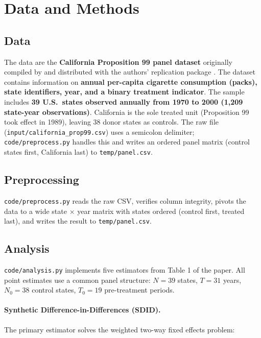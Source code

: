 \documentclass[12pt]{article}
\begin{document}
\section{Data and Methods}

\subsection*{Data}

The data are the \textbf{California Proposition 99 panel dataset} originally
compiled by \citet{abadie2010synthetic} and distributed with the authors'
replication package \citep{arkhangelsky2021synthdid}.
The dataset contains information on \textbf{annual per-capita cigarette
consumption (packs), state identifiers, year, and a binary treatment indicator}.
The sample includes \textbf{39 U.S.\ states observed annually from 1970 to 2000
(1,209 state-year observations)}.
California is the sole treated unit (Proposition 99 took effect in 1989),
leaving 38 donor states as controls.
The raw file (\texttt{input/california\_prop99.csv}) uses a semicolon delimiter;
\texttt{code/preprocess.py} handles this and writes an ordered panel matrix
(control states first, California last) to \texttt{temp/panel.csv}.

\subsection*{Preprocessing}

\texttt{code/preprocess.py} reads the raw CSV, verifies column integrity,
pivots the data to a wide state $\times$ year matrix with states ordered
(control first, treated last), and writes the result to \texttt{temp/panel.csv}.

\subsection*{Analysis}

\texttt{code/analysis.py} implements five estimators from Table 1 of the paper.
All point estimates use a common panel structure: $N = 39$ states,
$T = 31$ years, $N_0 = 38$ control states, $T_0 = 19$ pre-treatment periods.

\paragraph{Synthetic Difference-in-Differences (SDID).}
The primary estimator solves the weighted two-way fixed effects problem:
\end{document}
